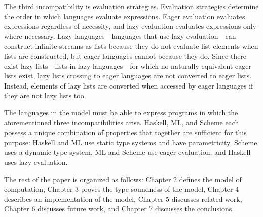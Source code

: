 The third incompatibility is evaluation strategies.  Evaluation strategies determine the order in which languages evaluate expressions.  Eager evaluation evaluates expressions regardless of necessity, and lazy evaluation evaluates expressions only where necessary.  Lazy languages---languages that use lazy evaluation---can construct infinite streams as lists because they do not evaluate list elements when lists are constructed, but eager languages cannot because they do.  Since there exist lazy lists---lists in lazy languages---for which no naturally equivalent eager lists exist, lazy lists crossing to eager languages are not converted to eager lists.  Instead, elements of lazy lists are converted when accessed by eager languages if they are not lazy lists too.

The languages in the model must be able to express programs in which the aforementioned three incompatibilities arise.  Haskell, ML, and Scheme each possess a unique combination of properties that together are sufficient for this purpose: Haskell and ML use static type systems and have parametricity, Scheme uses a dynamic type system, ML and Scheme use eager evaluation, and Haskell uses lazy evaluation.

The rest of the paper is organized as follows: Chapter 2 defines the model of computation, Chapter 3 proves the type soundness of the model, Chapter 4 describes an implementation of the model, Chapter 5 discusses related work, Chapter 6 discusses future work, and Chapter 7 discusses the conclusions.
